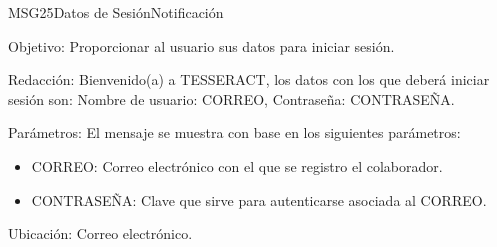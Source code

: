 \begin{mensaje}{MSG25}{Datos de Sesión}{Notificación}
	\item [Objetivo:] Proporcionar al usuario sus datos para iniciar sesión.
	\item[Redacción:] Bienvenido(a) a TESSERACT, los datos con los que deberá iniciar sesión son: Nombre de usuario: CORREO, Contraseña: CONTRASEÑA.
	\item[Parámetros:] El mensaje se muestra con base en los siguientes parámetros:
	\begin{itemize}
		\item CORREO: Correo electrónico con el que se registro el colaborador.
		\item CONTRASEÑA: Clave que sirve para autenticarse asociada al CORREO.
	\end{itemize}
	\item [Ubicación:] Correo electrónico.
\end{mensaje}